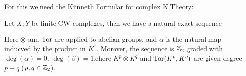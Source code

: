 	For this we need the Künneth Formular for complex K Theory: 
	\begin{theorem}
    Let $X;Y$ be finite CW-complexes, then we have a natural exact sequence
    \begin{center}
    \end{center}
    Here $\otimes$ and $\operatorname{\mathrm{Tor}}$ are applied to abelian groups, and $\alpha$ is the natural map inducved by the product in $K^*$. Morover, the sequence is $\mathbb{Z}_2$ graded with $\deg(\alpha)=0$, $\deg(\beta)=1$,ehere $K^p\otimes K^q$ and $\operatorname{\mathrm{Tor}}(K^p,K^q)$ are given degree $p+q$ ($p,q\in \mathbb{Z}_2$). 
\end{theorem}
